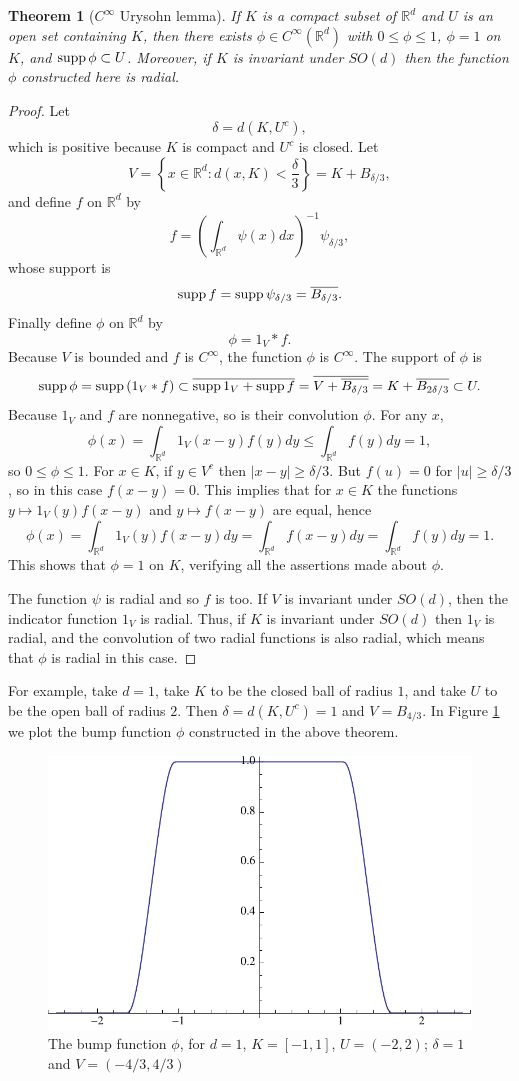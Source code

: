 \documentclass{article}
\newcommand{\supp}{\ensuremath\mathrm{supp}\,}
\newtheorem{theorem}{Theorem}
\theoremstyle{definition}
\begin{document}
\begin{theorem}[$C^\infty$ Urysohn lemma]
If $K$ is a compact subset of $\mathbb{R}^d$ and $U$ is an open set containing $K$,
then there exists $\phi \in C^\infty(\mathbb{R}^d)$ with $0 \leq \phi \leq 1$, $\phi=1$ on $K$,
and $\supp \phi \subset U$. Moreover, if $K$ is invariant under $SO(d)$ then the function $\phi$ constructed here
is radial.
\end{theorem}
\begin{proof}
Let
\[
\delta = d(K,U^c),
\]
which is positive 
because $K$ is compact and $U^c$ is closed.
Let
\[
V=\left\{x \in \mathbb{R}^d: d(x,K)<\frac{\delta}{3}\right\} = K+B_{\delta/3},
\]
and define $f$ on $\mathbb{R}^d$ by
\[
f = \left(\int_{\mathbb{R}^d} \psi(x) dx \right)^{-1} \psi_{\delta/3},
\]
whose support is
\[
\supp f = \supp \psi_{\delta/3} = \overline{B_{\delta/3}}.
\]
Finally define $\phi$ on $\mathbb{R}^d$ by
\[
\phi = 1_V * f.
\]
Because $V$ is bounded and $f$ is $C^\infty$, the function $\phi$ is $C^\infty$. 
The support of $\phi$ is
\[
\supp \phi = \supp(1_V*f) \subset \overline{\supp 1_V + \supp f}
=\overline{V+ \overline{B_{\delta/3}}}
=K+\overline{B_{2\delta/3}} \subset U.
\]
Because $1_V$ and $f$ are nonnegative, so is their convolution $\phi$. 
For any $x$,
\[
\phi(x) = \int_{\mathbb{R}^d} 1_V(x-y) f(y) dy
\leq \int_{\mathbb{R}^d} f(y) dy = 1,
\]
so $0 \leq \phi \leq 1$. 
For $x \in K$, if $y \in V^c$ then 
$|x-y| \geq \delta/3$.
But $f(u)=0$ for $|u| \geq \delta/3$, so in this case $f(x-y)=0$. 
This implies that for $x \in K$ the functions
$y \mapsto 1_V(y) f(x-y)$ and $y \mapsto f(x-y)$ are equal, hence
\[
\phi(x) = \int_{\mathbb{R}^d} 1_V(y) f(x-y) dy
=\int_{\mathbb{R}^d} f(x-y) dy
=\int_{\mathbb{R}^d} f(y) dy = 1.
\]
This shows that $\phi=1$ on $K$,  verifying all the assertions made about $\phi$.

The function $\psi$ is radial and so $f$ is too.
If $V$ is invariant under $SO(d)$, then the indicator function $1_V$ is radial. Thus, if $K$ is invariant under $SO(d)$ 
then $1_V$ is radial, and 
the convolution of two radial functions is also radial, which means that $\phi$ is  radial in this case.
\end{proof}


For example, take $d=1$, take
 $K$ to be the closed ball of radius $1$, and take  $U$ to be the open ball of radius $2$.
 Then $\delta=d(K,U^c) = 1$ and $V=B_{4/3}$. 
 In Figure \ref{urysohn} we plot the bump function $\phi$ constructed in the above theorem.
 
 
\begin{figure}
\includegraphics[scale=0.80]{phi}
\caption{The bump function $\phi$, for $d=1$, $K=[-1,1]$, $U=(-2,2)$; $\delta=1$ and $V=(-4/3,4/3)$}
\label{urysohn}
\end{figure}
\end{document}
